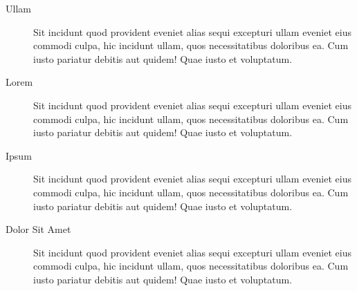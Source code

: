 \begin{description}
    \item[Ullam]
        Sit incidunt quod provident eveniet alias sequi excepturi ullam eveniet
        eius commodi culpa, hic incidunt ullam, quos necessitatibus doloribus
        ea. Cum iusto pariatur debitis aut quidem! Quae iusto et voluptatum.
    \item[Lorem]
        Sit incidunt quod provident eveniet alias sequi excepturi ullam eveniet
        eius commodi culpa, hic incidunt ullam, quos necessitatibus doloribus
        ea. Cum iusto pariatur debitis aut quidem! Quae iusto et voluptatum.
    \item[Ipsum]
        Sit incidunt quod provident eveniet alias sequi excepturi ullam eveniet
        eius commodi culpa, hic incidunt ullam, quos necessitatibus doloribus
        ea. Cum iusto pariatur debitis aut quidem! Quae iusto et voluptatum.
    \item[Dolor Sit Amet]
        Sit incidunt quod provident eveniet alias sequi excepturi ullam eveniet
        eius commodi culpa, hic incidunt ullam, quos necessitatibus doloribus
        ea. Cum iusto pariatur debitis aut quidem! Quae iusto et voluptatum.
\end{description}

